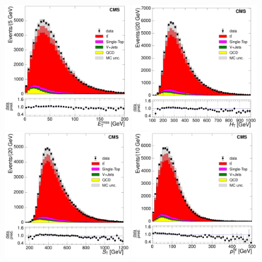 \begin{figure}[hbtp]
    \centering
     \includegraphics[width=0.48\textwidth]{Chapters/04_Analysis/04b_XSections/images/control_plots/before_fit/7TeV/EPlusJets_patType1CorrectedPFMet_2orMoreBtags_with_ratio.pdf}\hfill
     \includegraphics[width=0.48\textwidth]{Chapters/04_Analysis/04b_XSections/images/control_plots/before_fit/7TeV/EPlusJets_HT_2orMoreBtags_with_ratio.pdf}\\
     \includegraphics[width=0.48\textwidth]{Chapters/04_Analysis/04b_XSections/images/control_plots/before_fit/7TeV/EPlusJets_patType1CorrectedPFMet_ST_2orMoreBtags_with_ratio.pdf}\hfill
     \includegraphics[width=0.48\textwidth]{Chapters/04_Analysis/04b_XSections/images/control_plots/before_fit/7TeV/EPlusJets_patType1CorrectedPFMet_WPT_2orMoreBtags_with_ratio.pdf}\\

\end{figure}

